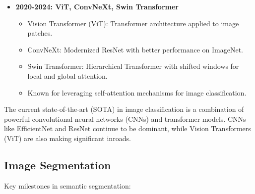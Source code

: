 \documentclass{article}
\begin{document}
\begin{itemize}[leftmargin=1.5em]
\begin{itemize}
        \item Total parameters: $\sim$5.3M (EfficientNet-B0) to $\sim$66M (EfficientNet-B7).
        \item Known for achieving high accuracy with fewer parameters.
    \end{itemize}
  \item \textbf{2020-2024: ViT, ConvNeXt, Swin Transformer} 
    \begin{itemize}
        \item Vision Transformer (ViT): Transformer architecture applied to image patches.
        \item ConvNeXt: Modernized ResNet with better performance on ImageNet.
        \item Swin Transformer: Hierarchical Transformer with shifted windows for local and global attention.
        \item Known for leveraging self-attention mechanisms for image classification.
    \end{itemize}
\end{itemize}
The current state-of-the-art (SOTA) in image classification is a combination of powerful convolutional neural networks (CNNs) and transformer models. CNNs like EfficientNet and ResNet continue to be dominant, while Vision Transformers (ViT) are also making significant inroads. 


\subsection{Image Segmentation}
Key milestones in semantic segmentation:
\end{document}
